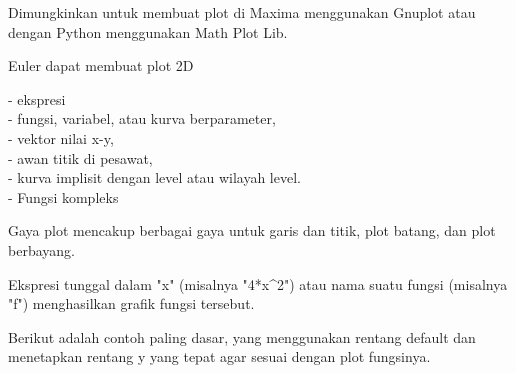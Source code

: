 \documentclass{article}
\begin{document}
\begin{eulernotebook}
\begin{eulercomment}
\begin{eulercomment}
\begin{eulercomment}
\begin{eulercomment}
\begin{eulercomment}
Dimungkinkan untuk membuat plot di Maxima menggunakan Gnuplot atau
dengan Python menggunakan Math Plot Lib.

Euler dapat membuat plot 2D

- ekspresi\\
- fungsi, variabel, atau kurva berparameter,\\
- vektor nilai x-y,\\
- awan titik di pesawat,\\
- kurva implisit dengan level atau wilayah level.\\
- Fungsi kompleks

Gaya plot mencakup berbagai gaya untuk garis dan titik, plot batang,
dan plot berbayang.\\
\begin{eulercomment}
\begin{eulercomment}
Ekspresi tunggal dalam "x" (misalnya "4*x\textasciicircum{}2") atau nama suatu fungsi
(misalnya "f") menghasilkan grafik fungsi tersebut.

Berikut adalah contoh paling dasar, yang menggunakan rentang default
dan menetapkan rentang y yang tepat agar sesuai dengan plot fungsinya.


\end{eulercomment}
\end{eulercomment}
\end{eulercomment}
\end{eulercomment}
\end{eulercomment}
\end{eulercomment}
\end{eulercomment}
\end{eulernotebook}
\end{document}
